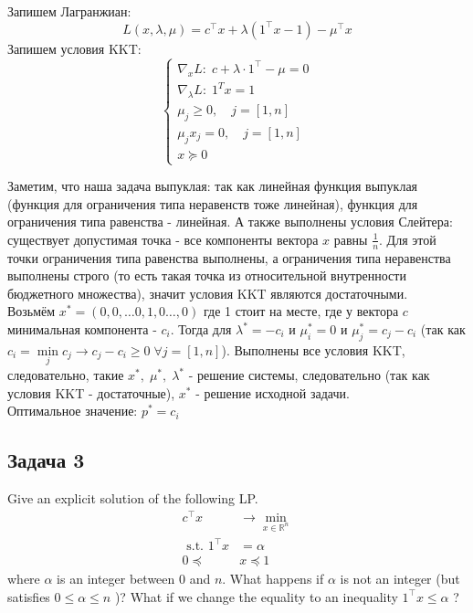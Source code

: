 \documentclass[a4paper,12pt]{article} %
\begin{document}
Запишем Лагранжиан: 
$$
L(x, \lambda, \mu) = c^{\top} x + \lambda \left( 1^{\top} x-1 \right) - \mu^{\top} x
$$
Запишем условия KKT:
$$
\left\{\begin{array}{l}
\nabla_x L: \; c+\lambda \cdot 1^{\top}-\mu=0 \\
\nabla_{\lambda} L: \; 1^{T} x=1 \\
\mu_{j} \geqslant 0 , \quad j=[1, n] \\
\mu_{j} x_{j}=0, \quad j=[1, n] \\
x \succeq 0
\end{array}\right.
$$

Заметим, что наша задача выпуклая: так как линейная функция выпуклая (функция для ограничения типа неравенств тоже линейная), функция для ограничения типа равенства - линейная. А также выполнены условия Слейтера: существует допустимая точка - все компоненты вектора $ x $ равны $ \frac{1}{n} $. Для этой точки ограничения типа равенства выполнены, а ограничения типа неравенства выполнены строго (то есть такая точка из относительной внутренности бюджетного множества), значит условия KKT являются достаточными.\\

Возьмём $ x^* = (0,0, \ldots 0,1,0 \ldots, 0) $ где 1 стоит на месте, где у вектора $ c $ минимальная компонента - $ c_i $. Тогда для  $ \lambda^* = -c_i $ и $ \mu_i^* = 0 $ и $ \mu_j^* = c_j - c_i $ (так как $ c_i = \min\limits_{j} c_j \rightarrow c_j - c_i \geq 0 \; \forall j = [1, n]$). Выполнены все условия KKT, следовательно, такие $ x^*, \; \mu^*, \; \lambda^* $ - решение системы, следовательно (так как условия  KKT - достаточные), $ x^* $ - решение исходной задачи.\\
Оптимальное значение: $ p^* = c_i $


\subsection*{Задача 3}
Give an explicit solution of the following LP.
$$
\begin{aligned}
c^{\top} x & \rightarrow \min _{x \in \mathbb{R}^{n}} \\
\text { s.t. } 1^{\top} x &=\alpha \\
0 \preceq & x \preceq 1
\end{aligned}
$$
where $\alpha$ is an integer between 0 and $n .$ What happens if $\alpha$ is not an integer (but satisfies $0 \leq \alpha \leq n$ )? What if we change the equality to an inequality $1^{\top} x \leq \alpha$ ?\\
\end{document}
